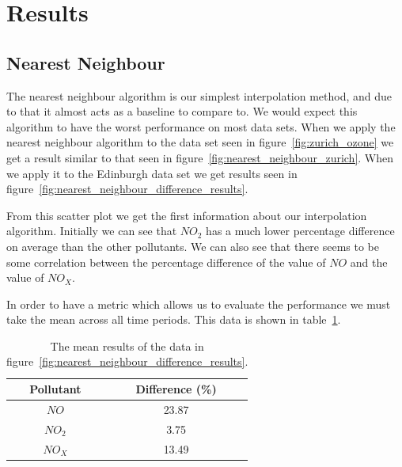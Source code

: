     \section{Results}\label{prediction_evaluation_results}

        \subsection{Nearest Neighbour}\label{prediction_evaluation_results_nearest_neighbour}


	        The nearest neighbour algorithm is our simplest interpolation method, and due to that it almost acts as a baseline to compare to. We would expect this algorithm to have the worst performance on most data sets. When we apply the nearest neighbour algorithm to the data set seen in figure~\ref{fig:zurich_ozone} we get a result similar to that seen in figure~\ref{fig:nearest_neighbour_zurich}. When we apply it to the Edinburgh data set we get results seen in figure~\ref{fig:nearest_neighbour_difference_results}. 


			From this scatter plot we get the first information about our interpolation algorithm. Initially we can see that $NO_{2}$ has a much lower percentage difference on average than the other pollutants. We can also see that there seems to be some correlation between the percentage difference of the value of $NO$ and the value of $NO_{X}$. 

			In order to have a metric which allows us to evaluate the performance we must take the mean across all time periods. This data is shown in table~\ref{tab:nearest_neighbour_difference_results_mean}. 

			\begin{table}
				\centering
	    		\begin{tabular}{|c|c|}
	    			\hline
			        Pollutant & Difference (\%) \\ \hline
					$NO$ & 23.87 \\
					$NO_{2}$ & 3.75 \\
					$NO_{X}$ & 13.49 \\ \hline
				\end{tabular}
				\caption{The mean results of the data in figure~\ref{fig:nearest_neighbour_difference_results}.}
				\label{tab:nearest_neighbour_difference_results_mean}
			\end{table}


